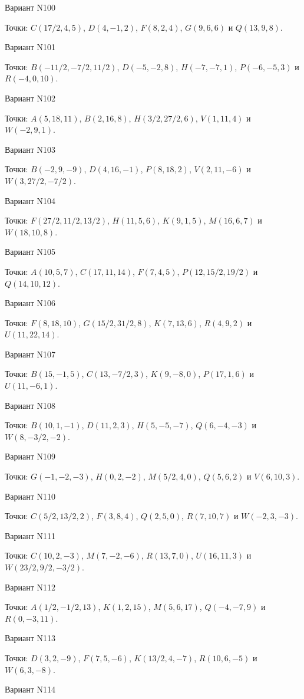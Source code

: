 \documentclass[11pt]{report}
\begin{document}
Вариант N100

Точки: $C(17/2, 4, 5)$, $D(4, -1, 2)$, $F(8, 2, 4)$, $G(9, 6, 6)$ и $Q(13, 9, 8)$.

Вариант N101

Точки: $B(-11/2, -7/2, 11/2)$, $D(-5, -2, 8)$, $H(-7, -7, 1)$, $P(-6, -5, 3)$ и $R(-4, 0, 10)$.

Вариант N102

Точки: $A(5, 18, 11)$, $B(2, 16, 8)$, $H(3/2, 27/2, 6)$, $V(1, 11, 4)$ и $W(-2, 9, 1)$.

Вариант N103

Точки: $B(-2, 9, -9)$, $D(4, 16, -1)$, $P(8, 18, 2)$, $V(2, 11, -6)$ и $W(3, 27/2, -7/2)$.

Вариант N104

Точки: $F(27/2, 11/2, 13/2)$, $H(11, 5, 6)$, $K(9, 1, 5)$, $M(16, 6, 7)$ и $W(18, 10, 8)$.

Вариант N105

Точки: $A(10, 5, 7)$, $C(17, 11, 14)$, $F(7, 4, 5)$, $P(12, 15/2, 19/2)$ и $Q(14, 10, 12)$.

Вариант N106

Точки: $F(8, 18, 10)$, $G(15/2, 31/2, 8)$, $K(7, 13, 6)$, $R(4, 9, 2)$ и $U(11, 22, 14)$.

Вариант N107

Точки: $B(15, -1, 5)$, $C(13, -7/2, 3)$, $K(9, -8, 0)$, $P(17, 1, 6)$ и $U(11, -6, 1)$.

Вариант N108

Точки: $B(10, 1, -1)$, $D(11, 2, 3)$, $H(5, -5, -7)$, $Q(6, -4, -3)$ и $W(8, -3/2, -2)$.

Вариант N109

Точки: $G(-1, -2, -3)$, $H(0, 2, -2)$, $M(5/2, 4, 0)$, $Q(5, 6, 2)$ и $V(6, 10, 3)$.

Вариант N110

Точки: $C(5/2, 13/2, 2)$, $F(3, 8, 4)$, $Q(2, 5, 0)$, $R(7, 10, 7)$ и $W(-2, 3, -3)$.

Вариант N111

Точки: $C(10, 2, -3)$, $M(7, -2, -6)$, $R(13, 7, 0)$, $U(16, 11, 3)$ и $W(23/2, 9/2, -3/2)$.

Вариант N112

Точки: $A(1/2, -1/2, 13)$, $K(1, 2, 15)$, $M(5, 6, 17)$, $Q(-4, -7, 9)$ и $R(0, -3, 11)$.

Вариант N113

Точки: $D(3, 2, -9)$, $F(7, 5, -6)$, $K(13/2, 4, -7)$, $R(10, 6, -5)$ и $W(6, 3, -8)$.

Вариант N114
\end{document}
